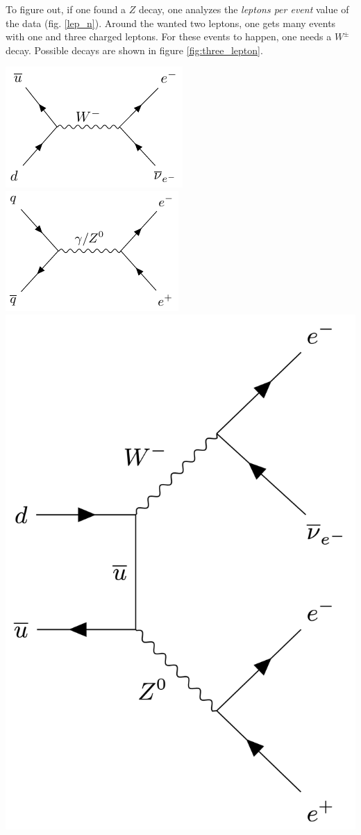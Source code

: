 \documentclass[12pt, a4paper, bibliography=totoc]{scrartcl}
\begin{document}
\begin{multicols}{2}
To figure out, if one found a $Z$ decay, one analyzes the \textit{leptons per event} value of the data (fig. \ref{lep_n}).
Around the wanted two leptons, one gets many events with one and three charged leptons. 
For these events to happen, one needs a $W^{\pm}$ decay.
Possible decays are shown in figure \ref{fig:three_lepton}.
    \begin{center}
        \includegraphics[width=0.45\linewidth]{fig/feynman_1.pdf} \hfill
        \includegraphics[width=0.45\linewidth]{fig/feynman_2.pdf} \\
        \includegraphics[width=0.45\linewidth]{fig/feynman_3.png}
\label{fig:three_lepton}
\end{center}


\end{multicols}
\end{document}
